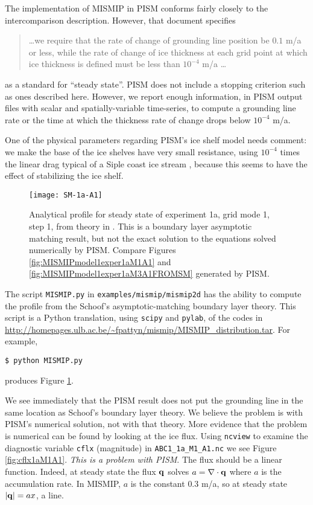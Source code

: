 The implementation of MISMIP in PISM conforms fairly closely to the intercomparison description.  However, that document specifies
\begin{quotation}
\dots we require that the rate of change of grounding line position be $0.1$ m/a or less, while the rate of change of ice thickness at each grid point at which ice thickness is defined must be less than $10^{-4}$ m/a \dots
\end{quotation}
as a standard for ``steady state''. PISM does not include a stopping criterion such as ones described here. However, we report enough information, in PISM output files with scalar and spatially-variable time-series, to compute a grounding line rate or the time at which the thickness rate of change drops below $10^{-4}$ m/a.

One of the physical parameters regarding PISM's ice shelf model needs comment: we make the base of the ice shelves have very small resistance, using $10^{-4}$ times the linear drag typical of a Siple coast ice stream \cite{HulbeMacAyeal}, because this seems to have the effect of stabilizing the ice shelf.

\begin{figure}[ht]
\centering
\texttt{[image: SM-1a-A1]}
\caption{Analytical profile for steady state of experiment 1a, grid mode 1, step 1, from theory in \cite{SchoofMarine1}.  This is a boundary layer asymptotic matching result, but not the exact solution to the equations solved numerically by PISM. Compare Figures \ref{fig:MISMIPmodel1exper1aM1A1} and \ref{fig:MISMIPmodel1exper1aM3A1FROMSM} generated by PISM.}
\label{fig:SMexper1aM1A1}
\end{figure}

The script \texttt{MISMIP.py} in \texttt{examples/mismip/mismip2d} has the ability to compute the profile from the Schoof's \cite{SchoofMarine1} asymptotic-matching boundary layer theory.  This script is a Python translation, using \texttt{scipy} and \texttt{pylab}, of the \Matlab codes in \url{http://homepages.ulb.ac.be/~fpattyn/mismip/MISMIP_distribution.tar}.  For example,

\begin{verbatim}
$ python MISMIP.py
\end{verbatim}

\noindent produces Figure \ref{fig:SMexper1aM1A1}.

We see immediately that the PISM result does not put the grounding line in the same location as Schoof's boundary layer theory.  We believe the problem is with PISM's numerical solution, not with that theory.  More evidence that the problem is numerical can be found by looking at the ice flux.  Using \texttt{ncview} to examine the diagnostic variable \texttt{cflx} (magnitude) in \texttt{ABC1_1a_M1_A1.nc} we see Figure \ref{fig:cflx1aM1A1}.  \emph{This is a problem with PISM}.  The flux should be a linear function.  Indeed, at steady state the flux $\mathbf{q}$ solves $a=\nabla\cdot\mathbf{q}$ where $a$ is the accumulation rate.  In MISMIP, $a$ is the constant $0.3$ m/a, so at steady state $|\mathbf{q}| = a x$, a line.

